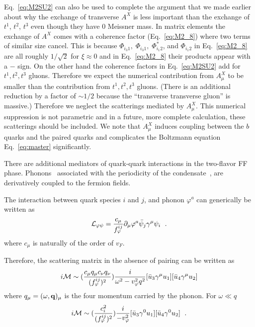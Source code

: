 \documentclass[10pt, aps, prd, superscriptaddress, nofootinbib, 
               amsmath, amssymb, twocolumn,
               preprintnumbers, showpacs,
               raggedbottom,
               floatfix]{revtex4-1}
\newcommand{\calM}{{\cal{M}}}
\newcommand{\calL}{{\cal{L}}}
\newcommand{\bfq}{{\bf{q}}}
\begin{document}
Eq.~\ref{eq:M2SU2} can also be used to complete the argument that we made
earlier about why the exchange of transverse $A^X$ is less important than the
exchange of $t^1$, $t^2$, $t^3$ even though they have $0$ Meissner mass. In matrix 
elements the exchange of $A^X$ comes with a coherence factor (Eq.~\ref{eq:M2_8}) where
two terms of similar size cancel. This is because $\Phi_{i_3 1},\; \Phi_{i_3 1},\; \Phi_{i_1
2}^*$, and $\Phi_{i_1 2}$ in Eq.~\ref{eq:M2_8} are all roughly $1/\sqrt{2}$ for
$\xi\approx 0$ and in Eq.~\ref{eq:M2_8} their products appear with a $-$ sign.  
On the other hand the coherence factors in Eq.~\ref{eq:M2SU2} add for $t^1,
t^2, t^3$ gluons. Therefore we expect the numerical
contribution from $A_\mu^X$ to be smaller than the contribution from $t^1, t^2,
t^3$ gluons. (There is an additional reduction by a factor of $\sim 1/2$ because
the ``transverse transverse gluon'' is massive.) Therefore we neglect the scatterings
mediated by $A_\mu^X$. This numerical suppression is not parametric and in a
future, more complete calculation, these scatterings should be included.  We
note that $A_\mu^X$ induces coupling between the $b$ quarks and the paired
quarks and complicates the Boltzmann equation Eq.~\ref{eq:master}
significantly.  

There are additional mediators of quark-quark interactions in the two-flavor FF
phase. Phonons~\cite{Casalbuoni:2001gt} associated with the periodicity of the
condensate~\cite{Mannarelli:2007bs,Radzihovsky:2009}, are derivatively coupled
to the fermion fields. 

The interaction between quark species $i$ and $j$, and phonon $\varphi^a$ can
generically be written as
\begin{equation}
\begin{split}
\calL_{\varphi\psi} = \frac{c_\mu}{f_\varphi^{ij}}
\partial_\mu\varphi^a\bar{\psi}_j \gamma^{\mu}
\psi_i~\label{eq:phonon_interaction}\;.
\end{split}
\end{equation}
where $c_\mu$ is naturally of the order of $v_F$.

Therefore, the scattering matrix in the absence of pairing can be written as
\begin{equation}
\begin{split}
i\calM \sim (\frac{c_\mu q_\mu c_\nu q_\nu}{(f_\varphi^{ij})^2})
\frac{i}{\omega^2-v_\varphi^2q^2}[\bar{u}_3\gamma^\mu u_1]
[\bar{u}_4\gamma^\mu u_2]
\end{split}
\end{equation}
where $q_\mu=(\omega,\bfq)_\mu$ is the four momentum carried by the phonon. For
$\omega\ll q$ 
\begin{equation}
\begin{split}
i\calM \sim (\frac{c_i^2}{(f_\varphi^{ij})^2})
\frac{i}{-v_\varphi^2}[\bar{u}_3\gamma^0 u_1]
[\bar{u}_4\gamma^0 u_2]~\label{eq:Mqqphonon}\;.
\end{split}
\end{equation}
\end{document}
